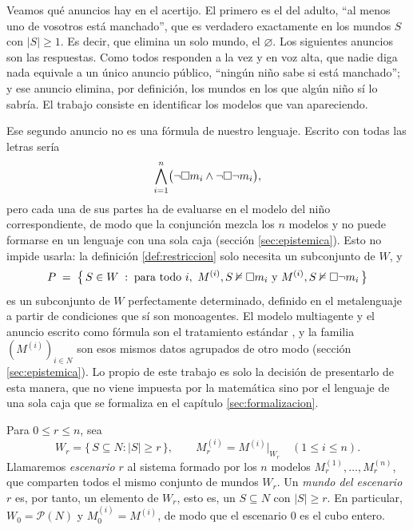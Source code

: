 Veamos qué anuncios hay en el acertijo. El primero es el del adulto, ``al menos uno de vosotros está manchado'', que es verdadero exactamente en los mundos $S$ con $|S| \ge 1$. Es decir, que elimina un solo mundo, el $\varnothing$. Los siguientes anuncios son las respuestas. Como todos responden a la vez y en voz alta, que nadie diga nada equivale a un único anuncio público, ``ningún niño sabe si está manchado''; y ese anuncio elimina, por definición, los mundos en los que algún niño sí lo sabría. El trabajo consiste en identificar los modelos que van apareciendo.

\begin{observacion}\label{obs:anuncio}
Ese segundo anuncio no es una fórmula de nuestro lenguaje. Escrito con todas las letras sería
\[
  \bigwedge_{i=1}^{n} \bigl(\lnot\square m_i \land \lnot\square\lnot m_i\bigr),
\]
pero cada una de sus partes ha de evaluarse en el modelo del niño correspondiente, de modo que la conjunción mezcla los $n$ modelos y no puede formarse en un lenguaje con una sola caja (sección \ref{sec:epistemica}). Esto no impide usarla: la definición \ref{def:restriccion} solo necesita un subconjunto de $W$, y
\[
  P \;=\; \bigl\{\, S \in W \;:\; \text{para todo } i,\
  M^{(i)}, S \nvDash \square m_i \ \text{y}\ M^{(i)}, S \nvDash \square\lnot m_i \,\bigr\}
\]
es un subconjunto de $W$ perfectamente determinado, definido en el metalenguaje a partir de condiciones que sí son monoagentes. El modelo multiagente y el anuncio escrito como fórmula son el tratamiento estándar \cite[cap.~1]{fhmv}, y la familia $(M^{(i)})_{i \in N}$ son esos mismos datos agrupados de otro modo (sección \ref{sec:epistemica}). Lo propio de este trabajo es solo la decisión de presentarlo de esta manera, que no viene impuesta por la matemática sino por el lenguaje de una sola caja que se formaliza en el capítulo \ref{sec:formalizacion}.
\end{observacion}

\begin{definicion}[Escenarios]\label{def:escenarios}
Para $0 \le r \le n$, sea
\[
  W_r = \{\, S \subseteq N : |S| \ge r \,\},
  \qquad
  M_r^{(i)} = M^{(i)}|_{W_r} \quad (1 \le i \le n).
\]
Llamaremos \emph{escenario $r$} al sistema formado por los $n$ modelos $M_r^{(1)}, \dots, M_r^{(n)}$, que comparten todos el mismo conjunto de mundos $W_r$. Un \emph{mundo del escenario $r$} es, por tanto, un elemento de $W_r$, esto es, un $S \subseteq N$ con $|S| \ge r$. En particular, $W_0 = \mathcal{P}(N)$ y $M_0^{(i)} = M^{(i)}$, de modo que el escenario $0$ es el cubo entero.
\end{definicion}

